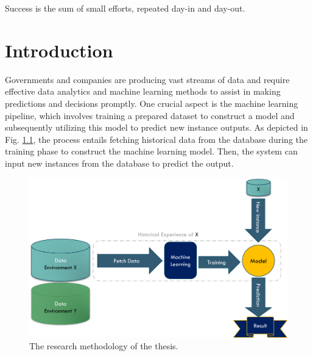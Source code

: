 



\begin{savequote}[50mm]
Success is the sum of small efforts, repeated day-in and day-out.
\end{savequote}

\chapter{Introduction}
\label{cha:1_Introduction}

\ifpdf
    \graphicspath{{1_introduction/figures/PNG/}{1_introduction/figures/PDF/}{1_introduction/figures/}}
\else
    \graphicspath{{1_introduction/figures/EPS/}{1_introduction/figures/}}
\fi



Governments and companies are producing vast streams of data and require effective data analytics and machine learning methods to assist in making predictions and decisions promptly. One crucial aspect is the machine learning pipeline, which involves training a prepared dataset to construct a model and subsequently utilizing this model to predict new instance outputs. As depicted in Fig. \ref{fig:machine-old-senario}, the process entails fetching historical data from the database during the training phase to construct the machine learning model. Then, the system can input new instances from the database to predict the output.

\begin{figure}[!ht]
    \centering
    \includegraphics[width=.9\textwidth]{1_introduction/figures/PNG/machine_flow.png}
    \caption{The research methodology of the thesis.}
    \label{fig:machine-old-senario}
\end{figure}

